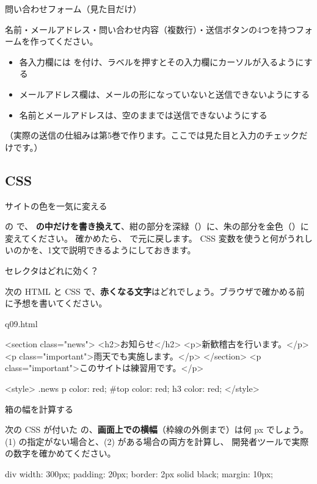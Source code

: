 \begin{exercise}[2]{問い合わせフォーム（見た目だけ）}
\toanswer\par
名前・メールアドレス・問い合わせ内容（複数行）・送信ボタンの4つを持つフォームを作ってください。
\begin{itemize}
  \item 各入力欄には  を付け、ラベルを押すとその入力欄にカーソルが入るようにする
  \item メールアドレス欄は、メールの形になっていないと送信できないようにする
  \item 名前とメールアドレスは、空のままでは送信できないようにする
\end{itemize}
（実際の送信の仕組みは第5巻で作ります。ここでは見た目と入力のチェックだけです。）
\end{exercise}

\subsection*{CSS}

\begin{exercise}[1]{サイトの色を一気に変える}
\toanswer\par
{} の  で、\textbf{ の中だけを書き換えて}、紺の部分を深緑（）に、朱の部分を金色（）に変えてください。
確かめたら、 で元に戻します。
CSS 変数を使うと何がうれしいのかを、1文で説明できるようにしておきます。
\end{exercise}

\begin{exercise}[1]{セレクタはどれに効く？}
\toanswer\par
次の HTML と CSS で、\textbf{赤くなる文字}はどれでしょう。ブラウザで確かめる前に予想を書いてください。
\begin{filebox}{q09.html}
\begin{Piton}[language=code]
<section class="news">
  <h2>お知らせ</h2>
  <p>新歓稽古を行います。</p>
  <p class="important">雨天でも実施します。</p>
</section>
<p class="important">このサイトは練習用です。</p>

<style>
  .news p { color: red; }
  #top { color: red; }
  h3 { color: red; }
</style>
\end{Piton}
\end{filebox}
\end{exercise}

\begin{exercise}[2]{箱の幅を計算する}
\toanswer\par
次の CSS が付いた  の、\textbf{画面上での横幅}（枠線の外側まで）は何 px でしょう。
(1)  の指定がない場合と、(2)  がある場合の両方を計算し、
開発者ツールで実際の数字を確かめてください。
\begin{Piton}[language=code]
div { width: 300px; padding: 20px; border: 2px solid black; margin: 10px; }
\end{Piton}
\end{exercise}

